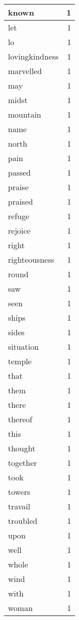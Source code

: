 \begin{center}
\begin{longtable}{l|r}
known & 1 \\ \hline
let & 1 \\ \hline
lo & 1 \\ \hline
lovingkindness & 1 \\ \hline
marvelled & 1 \\ \hline
may & 1 \\ \hline
midst & 1 \\ \hline
mountain & 1 \\ \hline
name & 1 \\ \hline
north & 1 \\ \hline
pain & 1 \\ \hline
passed & 1 \\ \hline
praise & 1 \\ \hline
praised & 1 \\ \hline
refuge & 1 \\ \hline
rejoice & 1 \\ \hline
right & 1 \\ \hline
righteousness & 1 \\ \hline
round & 1 \\ \hline
saw & 1 \\ \hline
seen & 1 \\ \hline
ships & 1 \\ \hline
sides & 1 \\ \hline
situation & 1 \\ \hline
temple & 1 \\ \hline
that & 1 \\ \hline
them & 1 \\ \hline
there & 1 \\ \hline
thereof & 1 \\ \hline
this & 1 \\ \hline
thought & 1 \\ \hline
together & 1 \\ \hline
took & 1 \\ \hline
towers & 1 \\ \hline
travail & 1 \\ \hline
troubled & 1 \\ \hline
upon & 1 \\ \hline
well & 1 \\ \hline
whole & 1 \\ \hline
wind & 1 \\ \hline
with & 1 \\ \hline
woman & 1 \\ \hline
\end{longtable}
\end{center}



\normalsize



